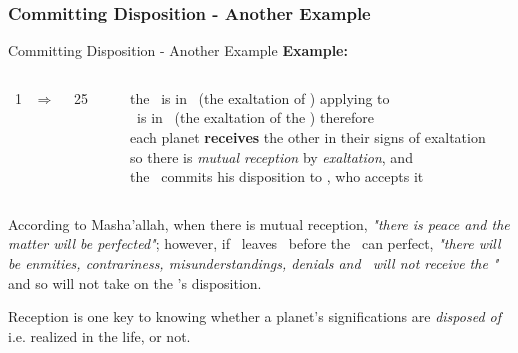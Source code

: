 \subsubsection{Committing Disposition - Another Example}
\begin{frame}[t]{Committing Disposition - Another Example}
\textbf{Example:}\footnotemark[1]
\begin{columns}[T, onlytextwidth]
\Sun\ 1 \Libra\ $\Rightarrow$ \Opposition\ \Saturn\ 25 \Aries

\rule{.1mm}{.25\textheight}

the \Sun\ is in \Libra\ (the exaltation of \Saturn) applying to \Opposition\ \Saturn \\
\Saturn\ is in \Aries\ (the exaltation of the \Sun) therefore \\
each planet \textbf{receives} the other in their signs of exaltation \\
so there is \textsl{mutual reception} by \textsl{exaltation}, and \\
the \Sun\ commits his disposition to \Saturn, who accepts it
\end{columns}
\vspace{0.25cm}
According to Masha'allah, when there is mutual reception, \textsl{"there is peace and the matter will be perfected"}; however, if \Saturn\ leaves \Aries\ before the \Opposition\ can perfect, \textsl{"there will be enmities, contrariness, misunderstandings, denials and \Saturn\ will not receive the \Sun"} and so will not take on the \Sun's disposition.

\begin{block}{}
Reception is one key to knowing whether a planet's significations are \textsl{disposed of} i.e. realized in the life, or not.
\end{block}

\end{frame}
